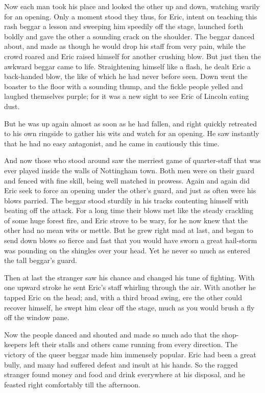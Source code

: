 Now each man took his place and looked the other up and down, watching
warily for an opening. Only a moment stood they thus, for Eric, intent
on teaching this rash beggar a lesson and sweeping him speedily off the
stage, launched forth boldly and gave the other a sounding crack on the
shoulder. The beggar danced about, and made as though he would drop his
staff from very pain, while the crowd roared and Eric raised himself for
another crushing blow. But just then the awkward beggar came to life.
Straightening himself like a flash, he dealt Eric a back-handed blow,
the like of which he had never before seen. Down went the boaster to the
floor with a sounding thump, and the fickle people yelled and laughed
themselves purple; for it was a new sight to see Eric of Lincoln eating
dust.

But he was up again almost as soon as he had fallen, and right quickly
retreated to his own ringside to gather his wits and watch for an
opening. He saw instantly that he had no easy antagonist, and he came in
cautiously this time.

And now those who stood around saw the merriest game of quarter-staff
that was ever played inside the walls of Nottingham town. Both men were
on their guard and fenced with fine skill, being well matched in
prowess. Again and again did Eric seek to force an opening under the
other's guard, and just as often were his blows parried. The beggar
stood sturdily in his tracks contenting himself with beating off the
attack. For a long time their blows met like the steady crackling of
some huge forest fire, and Eric strove to be wary, for he now knew that
the other had no mean wits or mettle. But he grew right mad at last, and
began to send down blows so fierce and fast that you would have sworn a
great hail-storm was pounding on the shingles over your head. Yet he
never so much as entered the tall beggar's guard.

Then at last the stranger saw his chance and changed his tune of
fighting. With one upward stroke he sent Eric's staff whirling through
the air. With another he tapped Eric on the head; and, with a third
broad swing, ere the other could recover himself, he swept him clear off
the stage, much as you would brush a fly off the window pane.

Now the people danced and shouted and made so much ado that the
shop-keepers left their stalls and others came running from every
direction. The victory of the queer beggar made him immensely popular.
Eric had been a great bully, and many had suffered defeat and insult at
his hands. So the ragged stranger found money and food and drink
everywhere at his disposal, and he feasted right comfortably till the
afternoon.


